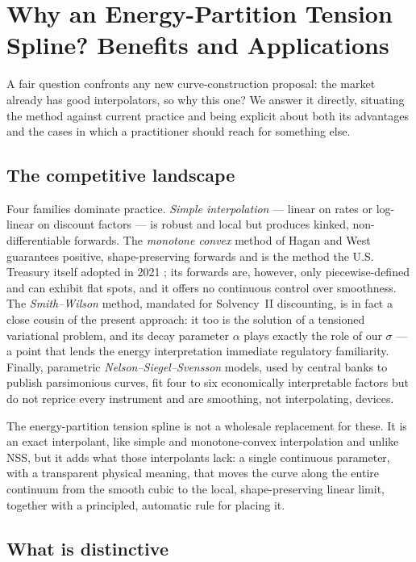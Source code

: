 \documentclass[]{interact}
\theoremstyle{plain}
\begin{document}
\section{Why an Energy-Partition Tension Spline? Benefits and Applications}\label{sec:why}
A fair question confronts any new curve-construction proposal: the market already has good
interpolators, so why this one? We answer it directly, situating the method against current
practice and being explicit about both its advantages and the cases in which a practitioner
should reach for something else.

\subsection{The competitive landscape}
Four families dominate practice. \emph{Simple interpolation} --- linear on rates or log-linear
on discount factors --- is robust and local but produces kinked, non-differentiable forwards.
The \emph{monotone convex} method of Hagan and West~\cite{Hagan} guarantees positive,
shape-preserving forwards and is the method the U.S. Treasury itself adopted in 2021
\cite{TreasuryMethod}; its forwards are, however, only piecewise-defined and can exhibit flat
spots, and it offers no continuous control over smoothness. The \emph{Smith--Wilson} method,
mandated for Solvency~II discounting, is in fact a close cousin of the present approach: it too
is the solution of a tensioned variational problem, and its decay parameter $\alpha$ plays
exactly the role of our $\sigma$ --- a point that lends the energy interpretation immediate
regulatory familiarity. Finally, parametric \emph{Nelson--Siegel--Svensson} models, used by
central banks to publish parsimonious curves, fit four to six economically interpretable
factors but do not reprice every instrument and are smoothing, not interpolating, devices.

The energy-partition tension spline is not a wholesale replacement for these. It is an exact
interpolant, like simple and monotone-convex interpolation and unlike NSS, but it adds what
those interpolants lack: a single continuous parameter, with a transparent physical meaning,
that moves the curve along the entire continuum from the smooth cubic to the local,
shape-preserving linear limit, together with a principled, automatic rule for placing it.

\subsection{What is distinctive}
\end{document}
